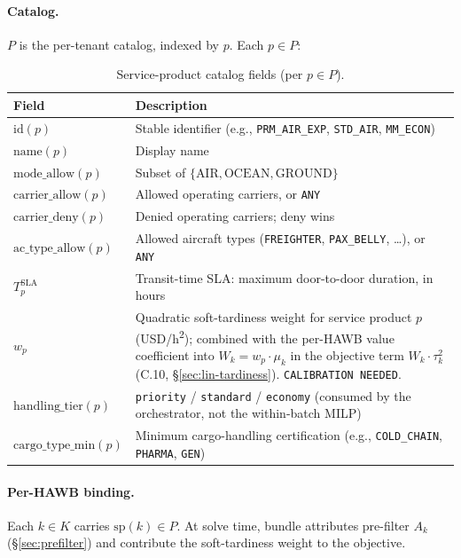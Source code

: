 \documentclass[11pt,a4paper]{article}
\theoremstyle{definition}
\begin{document}
\paragraph{Catalog.}
$P$ is the per-tenant catalog, indexed by $p$. Each $p \in P$:
\begin{table}[H]
\centering
\caption{Service-product catalog fields (per $p \in P$).}
\label{tab:service-product-fields}
\begin{tabular}{lp{9.5cm}}
\toprule
Field & Description \\
\midrule
$\text{id}(p)$ & Stable identifier (e.g., \texttt{PRM\_AIR\_EXP}, \texttt{STD\_AIR}, \texttt{MM\_ECON}) \\
$\text{name}(p)$ & Display name \\
$\text{mode\_allow}(p)$ & Subset of $\{\text{AIR}, \text{OCEAN}, \text{GROUND}\}$ \\
$\text{carrier\_allow}(p)$ & Allowed operating carriers, or \texttt{ANY} \\
$\text{carrier\_deny}(p)$ & Denied operating carriers; deny wins \\
$\text{ac\_type\_allow}(p)$ & Allowed aircraft types (\texttt{FREIGHTER}, \texttt{PAX\_BELLY}, \ldots), or \texttt{ANY} \\
$T^{\text{SLA}}_p$ & Transit-time SLA: maximum door-to-door duration, in hours \\
$w_p$ & Quadratic soft-tardiness weight for service product $p$ (USD/h\textsuperscript{2}); combined with the per-HAWB value coefficient into $W_k = w_p \cdot \mu_k$ in the objective term $W_k \cdot \tau_k^2$ (C.10, \S\ref{sec:lin-tardiness}). \texttt{CALIBRATION NEEDED}. \\
$\text{handling\_tier}(p)$ & \texttt{priority} / \texttt{standard} / \texttt{economy} (consumed by the orchestrator, not the within-batch MILP) \\
$\text{cargo\_type\_min}(p)$ & Minimum cargo-handling certification (e.g., \texttt{COLD\_CHAIN}, \texttt{PHARMA}, \texttt{GEN}) \\
\bottomrule
\end{tabular}
\end{table}

\paragraph{Per-HAWB binding.}
Each $k \in K$ carries $\text{sp}(k) \in P$. At solve time, bundle attributes
pre-filter $A_k$ (\S\ref{sec:prefilter}) and contribute the soft-tardiness
weight to the objective.
\end{document}

